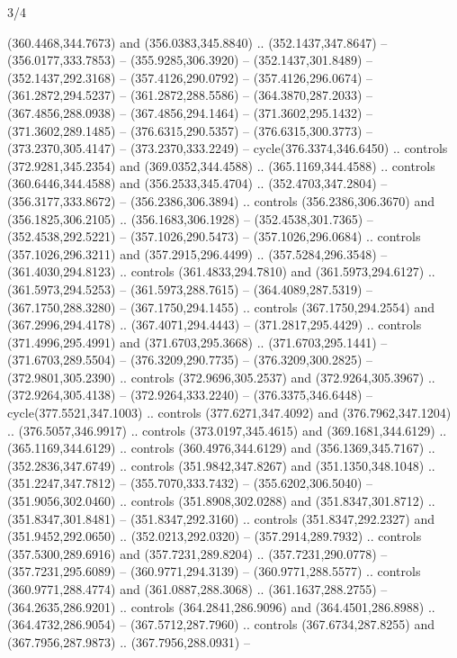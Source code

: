 \begin{flagdescription}{3/4}
\begin{scope}[xshift=0.5\flaglength]
\begin{scope}[scale=0.002\flagwidth,yshift=146.5mm,xshift=-52mm]
\begin{scope}[y=0.80pt, x=0.80pt, yscale=-1, xscale=1, inner sep=0pt, outer sep=0pt]
\begin{scope}[cm={{1.03426,0.0,0.0,1.03426,(-229.44745,-87.97837)}}]
\begin{scope}[line join=round,line cap=round,line width=0.746\lw]
  (360.4468,344.7673) and (356.0383,345.8840) .. (352.1437,347.8647) --
  (356.0177,333.7853) -- (355.9285,306.3920) -- (352.1437,301.8489) --
  (352.1437,292.3168) -- (357.4126,290.0792) -- (357.4126,296.0674) --
  (361.2872,294.5237) -- (361.2872,288.5586) -- (364.3870,287.2033) --
  (367.4856,288.0938) -- (367.4856,294.1464) -- (371.3602,295.1432) --
  (371.3602,289.1485) -- (376.6315,290.5357) -- (376.6315,300.3773) --
  (373.2370,305.4147) -- (373.2370,333.2249) -- cycle(376.3374,346.6450) ..
  controls (372.9281,345.2354) and (369.0352,344.4588) .. (365.1169,344.4588) ..
  controls (360.6446,344.4588) and (356.2533,345.4704) .. (352.4703,347.2804) --
  (356.3177,333.8672) -- (356.2386,306.3894) .. controls (356.2386,306.3670) and
  (356.1825,306.2105) .. (356.1683,306.1928) -- (352.4538,301.7365) --
  (352.4538,292.5221) -- (357.1026,290.5473) -- (357.1026,296.0684) .. controls
  (357.1026,296.3211) and (357.2915,296.4499) .. (357.5284,296.3548) --
  (361.4030,294.8123) .. controls (361.4833,294.7810) and (361.5973,294.6127) ..
  (361.5973,294.5253) -- (361.5973,288.7615) -- (364.4089,287.5319) --
  (367.1750,288.3280) -- (367.1750,294.1455) .. controls (367.1750,294.2554) and
  (367.2996,294.4178) .. (367.4071,294.4443) -- (371.2817,295.4429) .. controls
  (371.4996,295.4991) and (371.6703,295.3668) .. (371.6703,295.1441) --
  (371.6703,289.5504) -- (376.3209,290.7735) -- (376.3209,300.2825) --
  (372.9801,305.2390) .. controls (372.9696,305.2537) and (372.9264,305.3967) ..
  (372.9264,305.4138) -- (372.9264,333.2240) -- (376.3375,346.6448) --
  cycle(377.5521,347.1003) .. controls (377.6271,347.4092) and
  (376.7962,347.1204) .. (376.5057,346.9917) .. controls (373.0197,345.4615) and
  (369.1681,344.6129) .. (365.1169,344.6129) .. controls (360.4976,344.6129) and
  (356.1369,345.7167) .. (352.2836,347.6749) .. controls (351.9842,347.8267) and
  (351.1350,348.1048) .. (351.2247,347.7812) -- (355.7070,333.7432) --
  (355.6202,306.5040) -- (351.9056,302.0460) .. controls (351.8908,302.0288) and
  (351.8347,301.8712) .. (351.8347,301.8481) -- (351.8347,292.3160) .. controls
  (351.8347,292.2327) and (351.9452,292.0650) .. (352.0213,292.0320) --
  (357.2914,289.7932) .. controls (357.5300,289.6916) and (357.7231,289.8204) ..
  (357.7231,290.0778) -- (357.7231,295.6089) -- (360.9771,294.3139) --
  (360.9771,288.5577) .. controls (360.9771,288.4774) and (361.0887,288.3068) ..
  (361.1637,288.2755) -- (364.2635,286.9201) .. controls (364.2841,286.9096) and
  (364.4501,286.8988) .. (364.4732,286.9054) -- (367.5712,287.7960) .. controls
  (367.6734,287.8255) and (367.7956,287.9873) .. (367.7956,288.0931) --

\end{scope}
\end{scope}
\end{scope}
\end{scope}
\end{scope}
\end{flagdescription}
